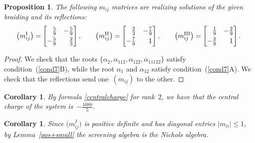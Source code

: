 \documentclass[10pt,a4paper]{amsart}
\numberwithin{equation}{section}
\newtheorem{cor}[teo]{Corollary}
\newtheorem{prop}[teo]{Proposition}
\begin{document}
\begin{prop}
The following $m_{ij}$ matrices are realizing solutions of the given braiding and its reflections:
\[\big(m_{ij}^{\mathrm{I}}\big)= \begin{bmatrix}
 \hphantom{-}\frac{5}{9} & -\frac{5}{9}\vspace{1mm}\\
 -\frac{5}{9} & \hphantom{-}\frac{2}{3}
\end{bmatrix}, \qquad
\big(m_{ij}^{\mathrm{II}}\big)= \begin{bmatrix}
\hphantom{-} \frac{2}{3} & -\frac{7}{9}\vspace{1mm}\\
 -\frac{7}{9} & \hphantom{-}1
\end{bmatrix}, \qquad
\big(m_{ij}^{\mathrm{III}}\big)= \begin{bmatrix}
 \hphantom{-}\frac{1}{9} & -\frac{2}{9}\vspace{1mm}\\
 -\frac{2}{9} & \hphantom{-}1
\end{bmatrix}. \]
\end{prop}
\begin{proof}
We check that the roots $\lbrace \alpha_2, \alpha_{112}, \alpha_{122}, \alpha_{11122}\rbrace$ satisfy condition~(\ref{cond7}B), while the root $\alpha_1$ and $\alpha_{12}$ satisfy condition~(\ref{cond7}A).
We check that the reflections send one~$(m_{ij})$ to the other.
\end{proof}
\begin{cor}
By formula \eqref{centralcharge} for rank~$2$, we have that the central charge of the system is~$-\frac{1088}{5}$.
\end{cor}

\begin{cor}Since $\big(m_{ij}^I\big)$ is positive definite and has diagonal entries $|m_{ii}|\leq 1$, by Lemma~{\rm \ref{pos+small}} the screening algebra is the Nichols algebra.
\end{cor}
\end{document}
